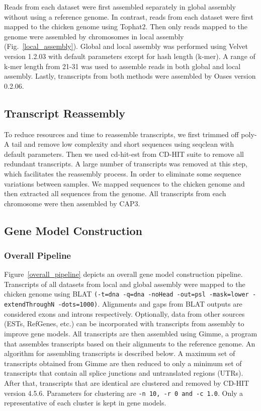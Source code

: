 \documentclass[10pt]{article}
\begin{document}
Reads from each dataset were first assembled separately in global assembly without using a reference genome.
In contrast, reads from each dataset were first mapped to the chicken genome using Tophat2.
Then only reads mapped to the genome were assembled by chromosomes in local assembly (Fig.~\ref{local_assembly}).
Global and local assembly was performed using Velvet version 1.2.03\cite{Zerbino:2008vu}
with default parameters except for hash length (k-mer).
A range of k-mer length from 21-31 was used to assemble reads in both global and local assembly.
Lastly, transcripts from both methods were assembled by Oases version 0.2.06\cite{Schulz:2012je}.

\subsection*{Transcript Reassembly}
To reduce resources and time to reassemble transcripts, we first trimmed off poly-A tail and remove low
complexity and short sequences using seqclean\cite{seqclean} with default parameters.
Then we used cd-hit-est from CD-HIT suite\cite{Li:2006hr} to remove all redundant transcripts.
A large number of transcripts was removed at this step, which facilitates the reassembly process.
In order to eliminate some sequence variations between samples.
We mapped sequences to the chicken genome and then extracted all sequences from the genome.
All transcripts from each chromosome were then assembled by CAP3\cite{Huang:1999wb}.

\subsection*{Gene Model Construction}

\subsubsection*{Overall Pipeline}

Figure~\ref{overall_pipeline} depicts an overall gene model construction pipeline.
Transcripts of all datasets from local and global assembly were mapped to the chicken genome using
BLAT\cite{Kent:2002tv} \texttt{(-t=dna -q=dna -noHead -out=psl -mask=lower -extendThroughN -dots=1000)}.
Alignments and gaps from BLAT outputs are considered exons and introns respectively.
Optionally, data from other sources (ESTs, RefGenes, etc.) can be incorporated with transcripts from assembly to improve gene models.
All transcripts are then assembled using Gimme, a program that assembles transcripts based on their alignments to the reference genome.
An algorithm for assembling transcripts is described below.
A maximum set of transcripts obtained from Gimme are then reduced to only a minimum set of transcripts that contain
all splice junctions and untranslated regions (UTRs).
After that, transcripts that are identical are clustered and removed by CD-HIT version 4.5.6\cite{Li:2006hr}.
Parameters for clustering are \texttt{-n 10, -r 0 and -c 1.0}.
Only a representative of each cluster is kept in gene models.
\end{document}
